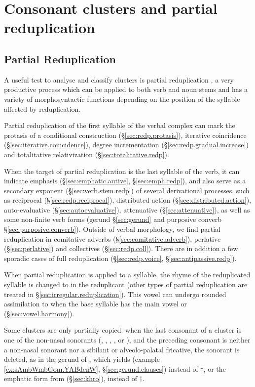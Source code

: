 \chapter{Consonant clusters and partial reduplication} \label{sec:clusters.redp}


\section{Partial Reduplication}  \label{sec:partial.redp}
A useful test to analyse and classify clusters is partial reduplication \citep{jacques07redupl}, a very productive process which can be applied to both verb and noun stems and has a variety of morphosyntactic functions depending on the position of the syllable affected by reduplication. 

Partial reduplication of the first syllable of the verbal complex can mark the protasis of a conditional construction (§\ref{sec:redp.protasis}), iterative coincidence (§\ref{sec:iterative.coincidence}), degree incrementation (§\ref{sec:redp.gradual.increase}) and totalitative relativization (§\ref{sec:totalitative.redp}).

When the target of partial reduplication is the last syllable of the verb, it can indicate emphasis (§\ref{sec:emphatic.autive}, §\ref{sec:emph.redp}), and also serve as a secondary exponent (§\ref{sec:verb.stem.redp}) of several derivational processes, such as reciprocal (§\ref{sec:redp.reciprocal}), distributed action (§\ref{sec:distributed.action}), auto-evaluative (§\ref{sec:autoevaluative}), attenuative (§\ref{sec:attenuative}), as well as some non-finite verb forms (gerund §\ref{sec:gerund} and purposive converb §\ref{sec:purposive.converb}). Outside of verbal morphology, we find partial reduplication in comitative adverbs (§\ref{sec:comitative.adverb}), perlative (§\ref{sec:perlative}) and collectives (§\ref{sec:redp.coll}).  There are in addition a few sporadic cases of full reduplication (§\ref{sec:redp.voice}, §\ref{sec:antipassive.redp}).  

When partial reduplication is applied to a syllable, the rhyme of the reduplicated syllable is  changed to  in the reduplicant (other types of partial reduplication are treated in §\ref{sec:irregular.reduplication}). This vowel can undergo rounded assimilation to  when the base syllable has the main vowel  or  (§\ref{sec:vowel.harmony}).

Some clusters are only partially copied: when the last consonant  of a cluster is one of the non-nasal sonorants (, , , ,  or ), and the preceding consonant is neither a non-nasal sonorant nor a sibilant or alveolo-palatal fricative, the sonorant is deleted, as in the gerund of , which yields  (example \ref{ex:sAmbWmbGom.YABdenW}, §\ref{sec:gerund.clauses}) instead of $\dagger$, or the emphatic form   from  (§\ref{sec:khro}), instead of $\dagger$.


